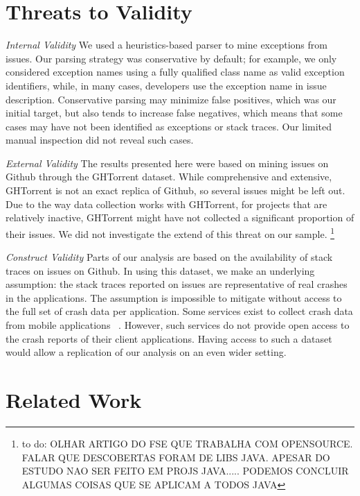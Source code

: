 \documentclass[conference]{IEEEtran}
\begin{document}

\section{Threats to Validity}
\label{sec:threats}

\noindent\emph{Internal Validity} We used a heuristics-based parser to mine
exceptions from issues.  Our parsing strategy was conservative by default; for
example, we only considered exception names using a fully qualified class name
as valid exception identifiers, while, in many cases, developers use the
exception name in issue description. Conservative parsing may minimize false
positives, which was our initial target, but also tends to increase false
negatives, which means that some cases may have not been identified as
exceptions or stack traces. Our limited manual inspection did not reveal such
cases.

\noindent\emph{External Validity} The results presented here were based on mining
issues on Github through the GHTorrent dataset. While comprehensive and
extensive, GHTorrent is not an exact replica of Github, so several issues might
be left out. Due to the way data collection works with GHTorrent, for projects
that are relatively inactive, GHTorrent might have not collected a significant
proportion of their issues. We did not investigate the extend of this threat on
our sample.
\footnote{to do: OLHAR ARTIGO DO FSE QUE TRABALHA COM OPENSOURCE.
FALAR QUE DESCOBERTAS FORAM DE LIBS JAVA. APESAR DO ESTUDO NAO SER FEITO EM PROJS JAVA.....
PODEMOS CONCLUIR ALGUMAS COISAS QUE SE APLICAM A TODOS JAVA}

\noindent\emph{Construct Validity} Parts of our analysis are based on the availability of stack traces on issues on
Github. In using this dataset, we make an underlying assumption: the
stack traces reported on issues are representative of real crashes in
the applications. The assumption is impossible to mitigate without access to
the full set of crash data per application. Some services exist to collect 
crash data from mobile applications ~\cite{BugSe14,BugSn14,Googl14,Acra14}.
However, such services do not provide open access to the crash reports
of their client applications. Having access to such a dataset would allow 
a replication of our analysis on an even wider setting.

\section{Related Work}
\label{sec:rele}
\end{document}
